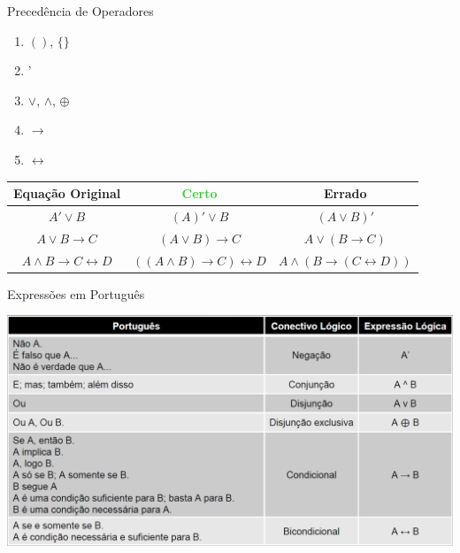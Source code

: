 \documentclass[aspectratio=169]{beamer}
\begin{document}
\begin{frame}{Precedência de Operadores}
    \begin{enumerate}
        \item $()$, $\{ \}$
        \item '
        \item  $\vee$, $\wedge$, $\oplus$
        \item $\rightarrow$
        \item $\leftrightarrow$
    \end{enumerate}

    \begin{table}[hb]
        \begin{tabular}{|c|c|c}
            \hline
            \rowcolor{Asparagus}
            Equação Original                               & \textcolor{LimeGreen}{Certo}                       & \textcolor{BrickRed}{Errado}                       \\
            \hline
            \hline
            \rowcolor{CambridgeBlue}
            $ A' \vee B $                                  & $ (A)' \vee B $                                    & $ (A \vee B)' $                                    \\
            \hline
            \rowcolor{TeaGreen}
            $ A \vee B \rightarrow C $                     & $ (A \vee B) \rightarrow C $                       & $ A \vee (B \rightarrow C) $                       \\
            \hline
            \rowcolor{CambridgeBlue}
            $ A \wedge B \rightarrow C \leftrightarrow D $ & $ ((A \wedge B) \rightarrow C) \leftrightarrow D $ & $ A \wedge (B \rightarrow (C \leftrightarrow D)) $ \\
            \hline
        \end{tabular}
    \end{table}

\end{frame}

\begin{frame}{Expressões em Português}
    \begin{center}
        \includegraphics[width=.8\linewidth]{figs/tabelaExpressoes.png}
    \end{center}
\end{frame}
\end{document}
